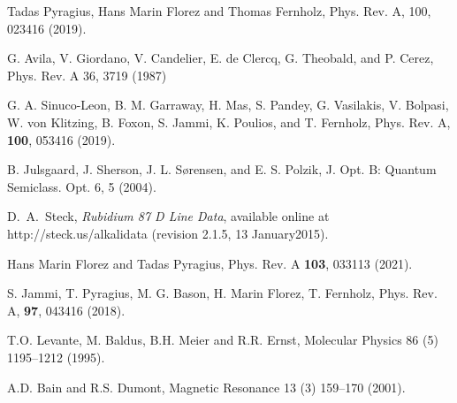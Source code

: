 \documentclass[%
reprint,
 amsmath,amssymb,
 aps,
floatfix,
]{revtex4-1}
\begin{document}
\begin{thebibliography}{41}
Tadas Pyragius, Hans Marin Florez and Thomas Fernholz, Phys. Rev. A, 100, 023416 (2019).

G. Avila, V. Giordano, V. Candelier, E. de Clercq, G. Theobald, and P. Cerez, Phys. Rev. A 36, 3719 (1987)

G. A. Sinuco-Leon, B. M. Garraway, H. Mas, S. Pandey, G. Vasilakis, V. Bolpasi, W. von Klitzing, B. Foxon, S. Jammi, K. Poulios, and T. Fernholz, Phys. Rev. A, {\bf100}, 053416 (2019).


B. Julsgaard, J. Sherson, J. L. S{\o}rensen, and E. S. Polzik, J. Opt. B: Quantum Semiclass. Opt. 6, 5 (2004).




D.~A.~Steck, \emph{Rubidium 87 D Line Data}, available online at http://steck.us/alkalidata (revision 2.1.5, 13 January2015).


Hans Marin Florez and Tadas Pyragius, Phys. Rev. A {\bf103}, 033113 (2021).

S. Jammi, T. Pyragius, M. G. Bason, H. Marin Florez, T. Fernholz, Phys. Rev. A, {\bf 97}, 043416 (2018).




T.O. Levante, M. Baldus, B.H. Meier and R.R. Ernst, Molecular Physics 86 (5) 1195–1212 (1995).

A.D. Bain and R.S. Dumont, Magnetic Resonance 13 (3) 159–170 (2001).






\end{thebibliography}
\end{document}
